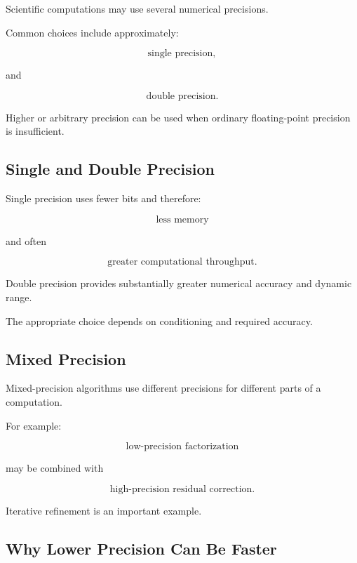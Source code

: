Scientific computations may use several numerical precisions.

Common choices include approximately:

\[
\boxed{
\text{single precision},
}
\]

and

\[
\boxed{
\text{double precision}.
}
\]

Higher or arbitrary precision can be used when ordinary floating-point
precision is insufficient.

\subsection{Single and Double Precision}
\label{subsec:single-double-precision}

Single precision uses fewer bits and therefore:

\[
\boxed{
\text{less memory}
}
\]

and often

\[
\boxed{
\text{greater computational throughput}.
}
\]

Double precision provides substantially greater numerical accuracy and
dynamic range.

The appropriate choice depends on conditioning and required accuracy.

\subsection{Mixed Precision}
\label{subsec:scientific-mixed-precision}

Mixed-precision algorithms use different precisions for different parts of
a computation.

For example:

\[
\boxed{
\text{low-precision factorization}
}
\]

may be combined with

\[
\boxed{
\text{high-precision residual correction}.
}
\]

Iterative refinement is an important example.

\subsection{Why Lower Precision Can Be Faster}
\label{subsec:why-lower-precision-faster}

